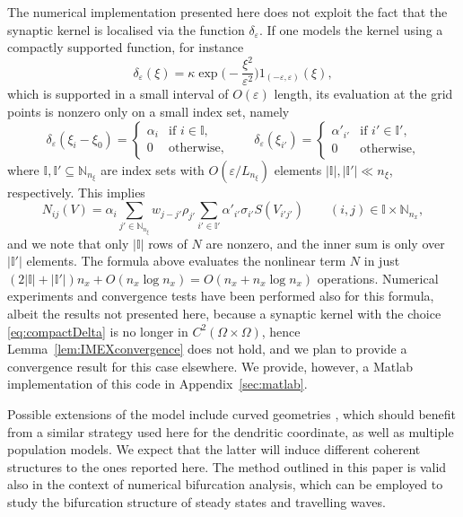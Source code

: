 \documentclass[a4paper,final]{siamart190516}
\newcommand{\Nb}{\mathbb{N}}
\newcommand{\Ib}{\mathbb{I}}
\newcommand{\ep}{\varepsilon}
\begin{document}
The numerical implementation presented here does not exploit the fact that the
synaptic kernel is localised via the function $\delta_\ep$. If one models the kernel
using a compactly supported function, for instance
\begin{equation}\label{eq:compactDelta}
  \delta_\ep(\xi) = \kappa
  \exp\bigg(-\frac{\xi^2}{\ep^2}\bigg) 1_{(-\ep,\ep)}(\xi), 
\end{equation}
which is supported in a small interval of $O(\ep)$ length, its
evaluation at the grid points is nonzero only on a small index set, namely
\[
  \delta_\ep(\xi_i-\xi_0) =
  \begin{cases}
    \alpha_i & \text{if $i \in \Ib$,} \\
    0        & \text{otherwise,}
  \end{cases}
  \qquad
  \delta_\ep(\xi_{i'}) =
  \begin{cases}
    \alpha'_{i'} & \text{if $i' \in \Ib'$,} \\
    0        & \text{otherwise,} 
  \end{cases}
\]
where $\Ib,\Ib' \subseteq \Nb_{n_\xi}$ are index sets with $O(\ep/L_{n_\xi})$
elements $|\Ib|, |\Ib'| \ll n_\xi$, respectively. This implies
\[
 N_{ij}(V) = \alpha_i \sum_{j' \in \Nb_{n_\xi}} w_{j-j'} \rho_{j'}
  \sum_{i' \in \Ib'} \alpha'_{i'} \sigma_{i'} S(V_{i'j'})
  \qquad
  (i,j) \in \Ib \times \Nb_{n_x},
\]
and we note that only $|\Ib|$ rows of $N$ are nonzero, and the inner sum is only over
$|\Ib'|$ elements. The formula above evaluates the nonlinear term $N$ in just
$(2|\Ib| + |\Ib'|)n_x + O(n_x \log n_x) = O(n_x + n_x\log n_x)$ operations. Numerical
experiments and convergence tests have been performed also for this formula, albeit
the results not presented here, because a synaptic kernel with the choice
\eqref{eq:compactDelta} is no longer in $C^2(\Omega \times \Omega)$, hence
Lemma~\ref{lem:IMEXconvergence} does not hold, and we plan to provide a convergence
result for this case elsewhere. We provide, however, a Matlab implementation of this
code in Appendix~\ref{sec:matlab}.

Possible extensions of the model include curved geometries \cite{Visser:2017hy,Bojak2010}, which should
benefit from a similar strategy used here for the dendritic coordinate, as well as
multiple population models. We expect that the latter will induce different coherent
structures to the ones reported here. The method outlined in this paper is valid also
in the context of numerical bifurcation analysis, which can be employed to study the
bifurcation structure of steady states and travelling waves.
\end{document}
